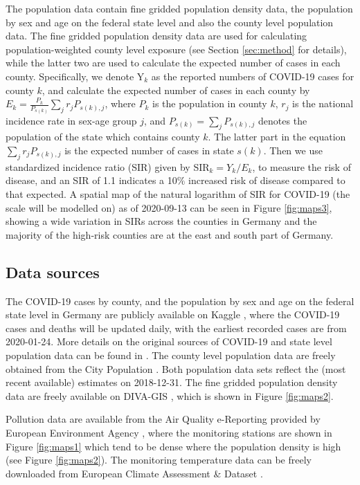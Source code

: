\documentclass[12,]{article}
\begin{document}
The population data contain fine gridded population density data, the
population by sex and age on the federal state level and also the county
level population data. The fine gridded population density data are used
for calculating population-weighted county level exposure (see Section
\ref{sec:method} for details), while the latter two are used to
calculate the expected number of cases in each county. Specifically, we
denote Y\(_k\) as the reported numbers of COVID-19 cases for county
\(k\), and calculate the expected number of cases in each county by
\(E_k=\frac{P_k}{P_{s(k)}} \sum_j r_j P_{s(k),j}\), where \(P_k\) is the
population in county \(k\), \(r_j\) is the national incidence rate in
sex-age group \(j\), and \(P_{s(k)}= \sum_jP_{s(k),j}\) denotes the
population of the state which contains county \(k\). The latter part in
the equation \(\sum_j r_j P_{s(k),j}\) is the expected number of cases
in state \(s(k)\). Then we use standardized incidence ratio (SIR) given
by SIR\(_{k}=Y_{k}/E_{k}\), to measure the risk of disease, and an SIR
of 1.1 indicates a 10\(\%\) increased risk of disease compared to that
expected. A spatial map of the natural logarithm of SIR for COVID-19
(the scale will be modelled on) as of 2020-09-13 can be seen in Figure
\ref{fig:maps3}, showing a wide variation in SIRs across the counties in
Germany and the majority of the high‐risk counties are at the east and
south part of Germany.

\hypertarget{data-sources}{%
\subsection{Data sources}\label{data-sources}}

The COVID-19 cases by county, and the population by sex and age on the
federal state level in Germany are publicly available on Kaggle
\autocite{HeadsorTails2020}, where the COVID-19 cases and deaths will be
updated daily, with the earliest recorded cases are from 2020-01-24.
More details on the original sources of COVID-19 and state level
population data can be found in \textcite{HeadsorTails2020}. The county
level population data are freely obtained from the City Population
\autocite{Citypopulation2019}. Both population data sets reflect the
(most recent available) estimates on 2018-12-31. The fine gridded
population density data are freely available on DIVA-GIS
\autocite{DIVAGIS2020}, which is shown in Figure \ref{fig:maps2}.

Pollution data are available from the Air Quality e-Reporting provided
by European Environment Agency \autocite{EEA2020}, where the monitoring
stations are shown in Figure \ref{fig:maps1} which tend to be dense
where the population density is high (see Figure \ref{fig:maps2}). The
monitoring temperature data can be freely downloaded from European
Climate Assessment \& Dataset \autocite{ECAD2020}.
\end{document}

